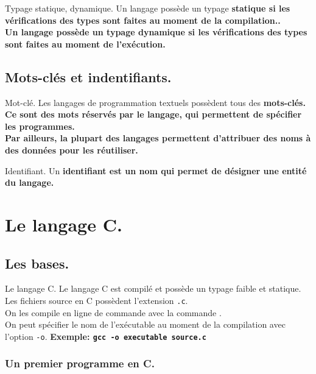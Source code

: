 \documentclass[french, 11pt]{article}
\begin{document}
\begin{defi}{Typage statique, dynamique.}{}
    Un langage possède un typage \bf{statique} si les vérifications des types sont faites au moment de la compilation..\\
    Un langage possède un typage \bf{dynamique} si les vérifications des types sont faites au moment de l'exécution.
\end{defi}

\subsection{Mots-clés et indentifiants.}

\begin{defi}{Mot-clé.}{}
    Les langages de programmation textuels possèdent tous des \bf{mots-clés}. Ce sont des mots réservés par le langage, qui permettent de spécifier les programmes.\\
    Par ailleurs, la plupart des langages permettent d'attribuer des noms à des données pour les réutiliser.
\end{defi}

\begin{defi}{Identifiant.}{}
    Un \bf{identifiant} est un nom qui permet de désigner une entité du langage.
\end{defi}

\section{Le langage C.}

\subsection{Les bases.}

\begin{defi}{Le langage C.}{}
    Le langage C est compilé et possède un typage faible et statique.\\
    Les fichiers source en C possèdent l'extension \texttt{.c}.\\
    On les compile en ligne de commande avec la commande .\\
    On peut spécifier le nom de l'exécutable au moment de la compilation avec l'option \texttt{-o}.\n
    \bf{Exemple:} \texttt{gcc -o executable source.c}
\end{defi}

\subsubsection{Un premier programme en C.}
\end{document}
